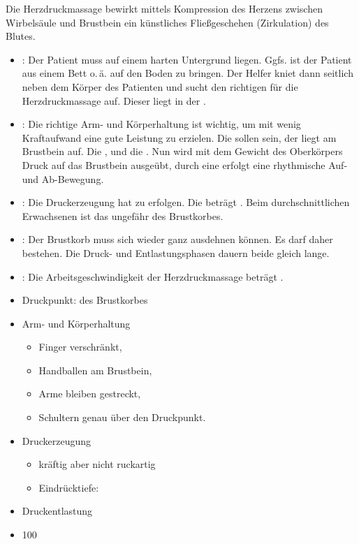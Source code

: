 {Die Herzdruckmassage bewirkt mittels Kompression des Herzens
zwischen Wirbelsäule und Brustbein ein künstliches Fließgeschehen
(Zirkulation) des Blutes.

\begin{itemize}
  \item {}: Der Patient muss auf
  einem harten Untergrund liegen. Ggfs. ist der Patient aus einem Bett
  o.\,ä. auf den Boden zu bringen. Der Helfer kniet
  dann seitlich neben dem Körper des Patienten und sucht
  den richtigen  für die Herzdruckmassage
  auf. Dieser liegt in der .
  \item {}: Die richtige
  Arm- und Körperhaltung ist wichtig, um mit wenig Kraftaufwand eine
  gute Leistung zu erzielen. 
  Die  
  sollen  sein, 
  der  liegt am Brustbein auf.
  Die , und die . 
  Nun wird mit dem Gewicht des Oberkörpers
  Druck auf das Brustbein ausgeübt, 
  durch eine  erfolgt eine rhythmische
  Auf- und Ab-Bewegung.
  \item {}: Die
  Druckerzeugung hat  zu
  erfolgen. Die
   beträgt . Beim
  durchschnittlichen Erwachsenen ist das ungefähr  des
  Brustkorbes.
  \item {}: Der Brustkorb muss sich wieder
  ganz ausdehnen können. Es darf daher 
  bestehen. Die Druck- und Entlastungsphasen dauern beide
  gleich lange.
  \item {}: Die
  Arbeitsgeschwindigkeit der Herzdruckmassage beträgt .
\end{itemize}


}{
\begin{itemize}
  \item Druckpunkt:  des Brustkorbes
  \item Arm- und Körperhaltung
  \begin{itemize}
    \item Finger verschränkt,
    \item Handballen am Brustbein,
    \item Arme bleiben gestreckt,
    \item Schultern genau über den Druckpunkt.
  \end{itemize}
  \item Druckerzeugung
  \begin{itemize}
    \item kräftig aber nicht ruckartig
    \item Eindrücktiefe: \CM*
  \end{itemize}
  \item Druckentlastung
  \item 100\PerMin*
\end{itemize}
}{}{}{}

